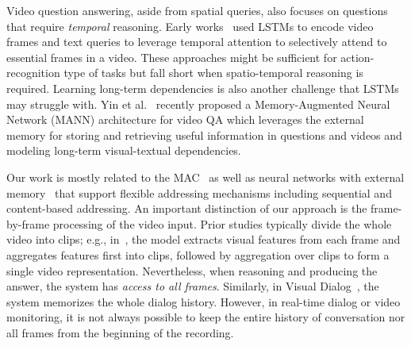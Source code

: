 Video question answering, aside from spatial queries, also focuses on questions that require \emph{temporal} reasoning. Early works~\cite{mun2017marioqa, xu2017video, yu2017end} used LSTMs to encode video frames and text queries to leverage temporal attention to selectively attend to essential frames in a video. These approaches might be sufficient for action-recognition type of tasks but fall short when spatio-temporal reasoning is required. Learning long-term dependencies is also another challenge that LSTMs may struggle with. Yin et al.~\cite{yin2019memory} recently proposed a Memory-Augmented Neural Network (MANN) architecture for video QA which leverages the external memory for storing and retrieving useful information in questions and videos and modeling long-term visual-textual dependencies.

Our work is mostly related to the MAC~\cite{hudson2018compositional} as well as neural networks with
external memory~\cite{graves2014neural, graves2016hybrid} that support flexible addressing mechanisms 
including sequential and content-based addressing. 
An important distinction of our approach is the frame-by-frame processing of the video input. Prior studies typically divide the whole video into clips; e.g., in~\cite{song2018explore}, the model extracts visual features from each frame and aggregates features first into clips, followed by aggregation over clips to form a single video representation. Nevertheless, when reasoning and producing the answer, the system has \emph{access to all frames}. Similarly, in Visual Dialog~\cite{das2017visual}, the system memorizes the whole dialog history. However, in real-time dialog or video monitoring, it is not always possible to keep the entire history of conversation nor all frames from the beginning of the recording.
